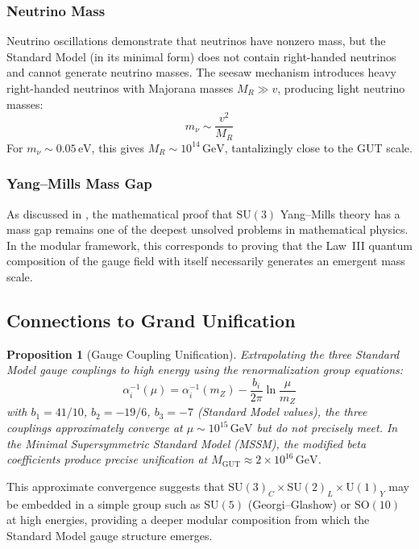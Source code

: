 \documentclass[12pt]{article}
\newtheorem{proposition}[theorem]{Proposition}
\theoremstyle{definition}
\theoremstyle{remark}
\newcommand{\GeV}{\,\mathrm{GeV}}
\begin{document}
\subsubsection{Neutrino Mass}

Neutrino oscillations demonstrate that neutrinos have nonzero mass, but the Standard Model (in its minimal form) does not contain right-handed neutrinos and cannot generate neutrino masses. The seesaw mechanism introduces heavy right-handed neutrinos with Majorana masses $M_R \gg v$, producing light neutrino masses:
\begin{equation}
m_\nu \sim \frac{v^2}{M_R}
\end{equation}
For $m_\nu \sim 0.05\,\mathrm{eV}$, this gives $M_R \sim 10^{14}\GeV$, tantalizingly close to the GUT scale.

\subsubsection{Yang--Mills Mass Gap}

As discussed in , the mathematical proof that $\mathrm{SU}(3)$ Yang--Mills theory has a mass gap remains one of the deepest unsolved problems in mathematical physics. In the modular framework, this corresponds to proving that the Law~III quantum composition of the gauge field with itself necessarily generates an emergent mass scale.

\subsection{Connections to Grand Unification}

\begin{proposition}[Gauge Coupling Unification]
\label{prop:gut}
Extrapolating the three Standard Model gauge couplings to high energy using the renormalization group equations:
\begin{equation}
\alpha_i^{-1}(\mu) = \alpha_i^{-1}(m_Z) - \frac{b_i}{2\pi}\ln\frac{\mu}{m_Z}
\end{equation}
with $b_1 = 41/10$, $b_2 = -19/6$, $b_3 = -7$ (Standard Model values), the three couplings approximately converge at $\mu \sim 10^{15}\GeV$ but do not precisely meet. In the Minimal Supersymmetric Standard Model (MSSM), the modified beta coefficients produce precise unification at $M_{\mathrm{GUT}} \approx 2 \times 10^{16}\GeV$.
\end{proposition}

This approximate convergence suggests that $\mathrm{SU}(3)_C \times \mathrm{SU}(2)_L \times \mathrm{U}(1)_Y$ may be embedded in a simple group such as $\mathrm{SU}(5)$ (Georgi--Glashow) or $\mathrm{SO}(10)$ at high energies, providing a deeper modular composition from which the Standard Model gauge structure emerges.
\end{document}
